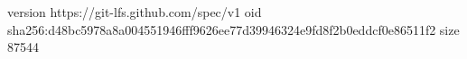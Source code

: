 version https://git-lfs.github.com/spec/v1
oid sha256:d48bc5978a8a004551946fff9626ee77d39946324e9fd8f2b0eddcf0e86511f2
size 87544
